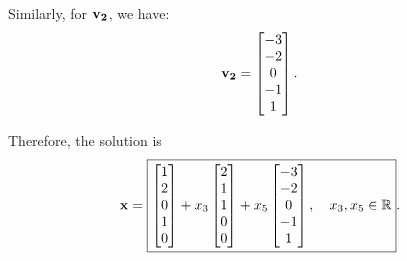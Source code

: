 \begin{solution}
    Similarly, for $\bm{\mathrm{v_2}}$, we have:
    \[
        \bm{\mathrm{v_2}} = \begin{bmatrix}
            -3 \\ -2 \\ 0 \\ -1 \\ 1
        \end{bmatrix}.
    \]

    Therefore, the solution is
    \[
        \bm{\mathrm{x}} = \boxed{\begin{bmatrix}
            1 \\ 2 \\ 0 \\ 1 \\ 0
        \end{bmatrix} + x_3\begin{bmatrix}
            2 \\ 1 \\ 1 \\ 0 \\ 0
        \end{bmatrix} + x_5\begin{bmatrix}
            -3 \\ -2 \\ 0 \\ -1 \\ 1
        \end{bmatrix}, \quad x_3, x_5\in\mathbb{R}}.
    \]
\end{solution}